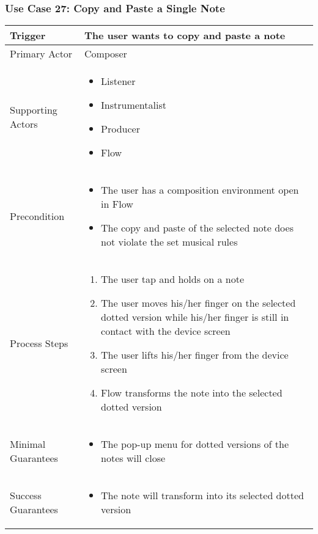 \subsubsection{Use Case 27: Copy and Paste a Single Note}

\begin{tabularx}{\textwidth}{|X|X|}
\hline
Trigger & 
The user wants to copy and paste a note \\
\hline
Primary Actor & 
Composer \\
\hline
Supporting Actors & 
\begin{itemize}
\item Listener
\item Instrumentalist
\item Producer
\item Flow
\end{itemize} \\
\hline
Precondition & 
\begin{itemize}
\item The user has a composition environment open in Flow
\item The copy and paste of the selected note does not violate the set musical rules
\end{itemize} \\
\hline
Process Steps & 
\begin{enumerate}
\item The user tap and holds on a note
\item The user moves his/her finger on the selected dotted version while his/her finger is still in contact with the device screen
\item The user lifts his/her finger from the device screen
\item Flow transforms the note into the selected dotted version
\end{enumerate} \\
\hline
Minimal Guarantees & 
\begin{itemize}
  \item The pop-up menu for dotted versions of the notes will close
\end{itemize} \\
\hline
Success Guarantees & 
\begin{itemize}
  \item The note will transform into its selected dotted version 
\end{itemize} \\
\hline
\end{tabularx}


